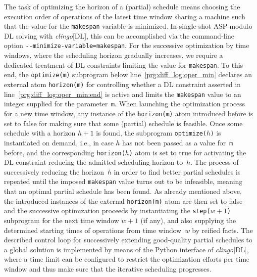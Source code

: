 \documentclass{tlp} %
\newcommand{\clingodl}{\emph{clingo}[DL]\xspace}
\begin{document}
The task of optimizing the horizon of a (partial) schedule means choosing
the execution order of operations of the latest time window sharing a machine
such that the value for the \lstinline{makespan} variable is minimized.
In single-shot ASP modulo DL solving with \clingodl, this can be accomplished
via the command-line option \lstinline{--minimize-variable=makespan}.
For the successive optimization by time windows, where the scheduling
horizon gradually increases, we require a dedicated treatment of DL constraints
limiting the value for \lstinline{makespan}.
To this end, the \lstinline{optimize(m)} subprogram below line~\ref{prg:diff_log:oper_min}
declares an external atom \lstinline{horizon(m)} for controlling whether a DL
constraint asserted in line~\ref{prg:diff_log:oper_min:end} is active and limits
the \lstinline{makespan} value to an integer supplied for the parameter~\lstinline{m}.
When launching the optimization process for a new time window, any instance of the
\lstinline{horizon(m)} atom introduced before is set to false for making sure that
some (partial) schedule is feasible.
Once some schedule with a horizon $h+1$ is found,
the subprogram \lstinline{optimize(}$h$\lstinline{)} is instantiated on demand, i.e.,
in case $h$ has not been passed as a value for~\lstinline{m} before, and
the corresponding \lstinline{horizon(}$h$\lstinline{)} atom is set to true for activating the DL
constraint reducing the admitted scheduling horizon to~$h$.
The process of successively reducing the horizon~$h$ in order to find better partial schedules
is repeated until the imposed \lstinline{makespan} value turns out to be infeasible,
meaning that an optimal partial schedule has been found.
As already mentioned above, the introduced instances of the external \lstinline{horizon(m)} atom
are then set to false and the successive optimization proceeds by instantiating the
\lstinline{step(}$w+1$\lstinline{)} subprogram for the next time window $w+1$ (if any), and
also supplying the determined starting times of operations from time window~$w$
by reified facts.
The described control loop for successively extending good-quality partial schedules to
a global solution is implemented by means of the Python interface of \clingodl,
where a time limit can be configured to restrict the optimization efforts per time window
and thus make sure that the iterative scheduling progresses.

\end{document}
